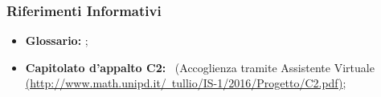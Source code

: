\documentclass[../AnalisiDeiRquisiti.tex]{subfiles}
\begin{document}
		\subsubsection{Riferimenti Informativi}	
		\begin{itemize}
			\item \textbf{Glossario:} \glossariov;
			\item\textbf{Capitolato d'appalto C2:} \progetto\ (Accoglienza tramite Assistente Virtuale \href{http://www.math.unipd.it/~tullio/IS-1/2016/Progetto/C2.pdf}{(http://www.math.unipd.it/~tullio/IS-1/2016/Progetto/C2.pdf)};
		\end{itemize}
			
\end{document}

